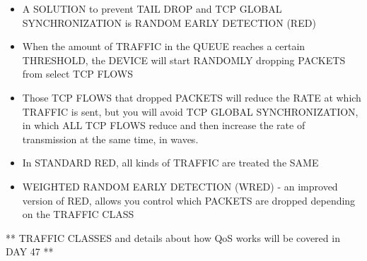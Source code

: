 \begin{itemize}
\item
  A SOLUTION to prevent TAIL DROP and TCP GLOBAL SYNCHRONIZATION is
  RANDOM EARLY DETECTION (RED)
\item
  When the amount of TRAFFIC in the QUEUE reaches a certain THRESHOLD,
  the DEVICE will start RANDOMLY dropping PACKETS from select TCP FLOWS
\item
  Those TCP FLOWS that dropped PACKETS will reduce the RATE at which
  TRAFFIC is sent, but you will avoid TCP GLOBAL SYNCHRONIZATION, in
  which ALL TCP FLOWS reduce and then increase the rate of transmission
  at the same time, in waves.
\item
  In STANDARD RED, all kinds of TRAFFIC are treated the SAME
\item
  WEIGHTED RANDOM EARLY DETECTION (WRED) - an improved version of RED,
  allows you control which PACKETS are dropped depending on the TRAFFIC
  CLASS
\end{itemize}

** TRAFFIC CLASSES and details about how QoS works will be covered in
DAY 47 **
